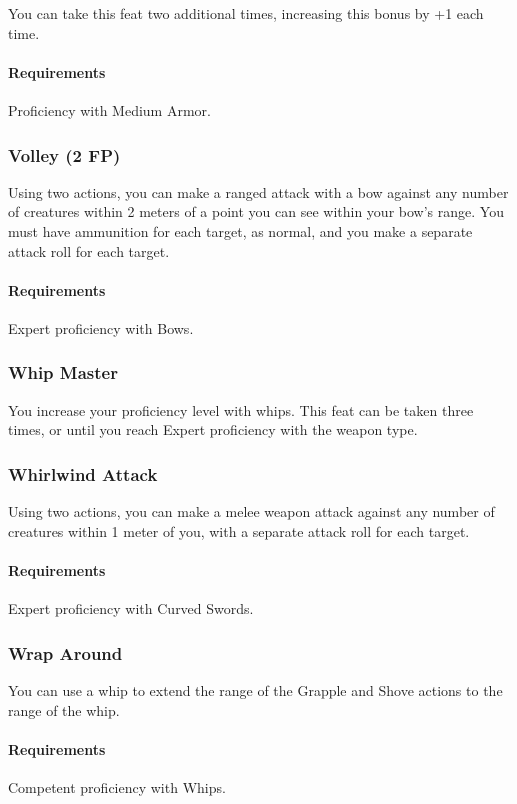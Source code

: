     You can take this feat two additional times, increasing this bonus by +1 each time.
    \paragraph{Requirements} Proficiency with Medium Armor.
\subsubsection{Volley (2 FP)} \label{feat::volley}
    Using two actions, you can make a ranged attack with a bow against any number of creatures within 2 meters of a point you can see within your bow's range.
    You must have ammunition for each target, as normal, and you make a separate attack roll for each target.
    \paragraph{Requirements} Expert proficiency with Bows.
\subsubsection{Whip Master} \label{feat::whipmaster}
    You increase your proficiency level with whips.
    This feat can be taken three times, or until you reach Expert proficiency with the weapon type.
\subsubsection{Whirlwind Attack} \label{feat::whirlwindattack}
    Using two actions, you can make a melee weapon attack against any number of creatures within 1 meter of you, with a separate attack roll for each target.
    \paragraph{Requirements} Expert proficiency with Curved Swords.
\subsubsection{Wrap Around} \label{feat::wraparound}
    You can use a whip to extend the range of the Grapple and Shove actions to the range of the whip.
    \paragraph{Requirements} Competent proficiency with Whips.

